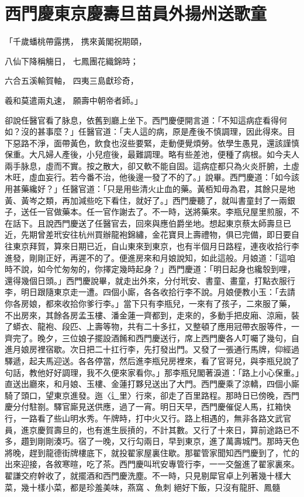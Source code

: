 %

\chapter{西門慶東京慶壽旦\KG 苗員外揚州送歌童}

「千歲蟠桃帶露携，  携來黃閣祝期頤，

八仙下降稱觴日，  七鳳團花織錦時；

六合五溪輸賀軸，  四夷三島獻珍奇，

羲和莫遣兩丸速，  願壽中朝帝者師。」

卻說任醫官看了脉息，依舊到廳上坐下。西門慶便開言道：「不知這病症看得何如？沒的甚事麼？」任醫官道：「夫人這的病，原是產後不慎調理，因此得來。目下惡路不淨，面帶黃色，飲食也沒些要緊，走動便覺煩勞。依學生愚見，還該謹慎保重。大凡婦人產後，小兒痘後，最難調理。略有些差池，便種了病根。如今夫人兩手脉息，虛而不實。按之散大，卻又軟不能自固。這病症都只為火炎肝腑，土虛木旺，虛血妄行。若今番不治，他後邊一發了不的了。」說畢。西門慶道：「如今該用甚藥纔好？」任醫官道：「只是用些清火止血的藥。黃栢知毋為君，其餘只是地黃、黃岑之類，再加減些吃下看住，就好了。」西門慶聽了，就叫書童封了一兩銀子，送任一官做藥本。任一官作謝去了。不一時，送將藥來。李瓶兒屋里煎服，不在話下。且說西門慶送了任醫官去，回來與應伯爵坐地。想起東京蔡太師壽旦已近，先期曾差玳安往杭州買辦龍袍錦繡，金花寶貝上壽禮物，俱已完備，即日要自往東京拜賀，算來日期已近，自山東來到東京，也有半個月日路程，連夜收拾行李進發，剛剛正好，再遲不的了。便進房來和月娘說知，如此這般。月娘道：「這咱時不說，如今忙匆匆的，你擇定幾時起身？」西門慶道：「明日起身也纔彀到哩，還得幾個日頭。」西門慶說畢，就走出外來，分付玳安、書童、畫童，打點衣服行李，明日跟隨東京走一遭。四個小廝，各各收拾行李不說。月娘便教小玉：「去請你各房娘，都來收拾你爹行李。」當下只有李瓶兒，一來有了孩子，二來服了藥，不出房來，其餘各房孟玉樓、潘金蓮一齊都到，走來的，多動手把皮廂、涼廂，裝了蟒衣、龍袍、段匹、上壽等物，共有二十多扛，又整頓了應用冠帶衣服等件，一齊完了。晚夕，三位娘子擺設酒餚和西門慶送行，席上西門慶各人叮囑了幾句，自進月娘房裡宿歇。次日把二十扛行李，先打發出門。又發了一張通行馬牌，仰經過驛遞，起夫馬迎送。各各停當，然后進李瓶兒房裡來，看了官哥兒，與李瓶兒說了句話，教他好好調理，我不久便來家看你。」那李瓶兒閣著淚道：「路上小心保重。」直送出廳來，和月娘、玉樓、金蓮打夥兒送出了大門。西門慶乘了涼轎，四個小廝騎了頭口，望東京進發。迤〈辶里〉行來，卻走了百里路程。那時日已傍晚，西門慶分付駐劄。驛官廝見送供應，過了一宵。明日天早，西門慶催促人馬，扛箱快行，一路看了些山明水秀。午牌時，打中火又行。路上相遇的，無非各路文武官員，進京慶賀壽旦的，也有進生辰摃的，不計其數。又行了十來日，算前途路已不多，趲到剛剛湊巧。宿了一晚，又行勾兩日，早到東京，進了萬壽城門。那時天色將晚，趕到龍德街牌樓底下，就投翟家屋裏住歇。那翟管家聞知西門慶到了，忙的出來迎接，各敘寒暄，吃了茶。西門慶叫玳安專管行李，一一交盤進了翟家裏來。翟謙交府幹收了，就擺酒和西門慶洗塵。不一時，只見剔犀官卓上列著幾十樣大菜，幾十樣小菜，都是珍羞美味，燕窩 、魚刺 絕好下飯，只沒有龍肝、鳳髓 